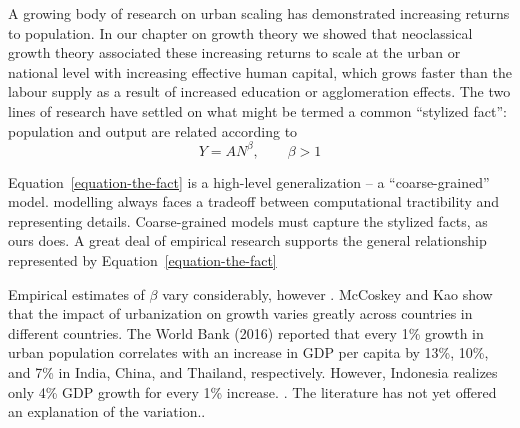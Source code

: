 A growing body of research on urban scaling has demonstrated increasing returns to population. In our chapter on growth theory we showed that neoclassical growth theory associated these increasing returns to scale at the urban or national level with increasing effective human capital, which grows faster than the labour supply as a result of increased education or agglomeration effects. The two lines of research have settled on what might be termed a  common ``stylized  fact'': population and output are related according to 
\begin{equation}
    Y=AN^\beta,\qquad \beta>1 \label{equation-the-fact}
\end{equation}

Equation~\ref{equation-the-fact}  is a high-level generalization -- a ``coarse-grained'' model.
modelling always faces a tradeoff between computational tractibility and representing details. Coarse-grained models must capture the stylized facts, as ours does. A great deal of empirical research supports the general relationship represented by Equation~\ref{equation-the-fact}

\cite{GET_TerrysDissertation, GET_PaulsBook}


Empirical estimates of $\beta$ vary considerably, however\cite{rosenthalEvidenceNatureSources2004}\cite{bettencourtIntroductionUrbanScience2021} \cite{loboUrbanScalingProduction2013}. 
McCoskey and Kao \cite{mccoskeyPanelDataInvestigation}show that  the impact of urbanization on growth varies greatly across countries in different countries.
The World Bank (2016) reported that every 1\% growth in urban population correlates with an increase in GDP per capita by 13\%, 10\%, and 7\% in India, China, and Thailand, respectively.  However, Indonesia realizes only 4\% GDP growth for every 1\% increase. \cite{haryantotriRelationshipUrbanizationEducation2021}. The literature has not yet offered an explanation  of the variation.\cite{loboUrbanScalingProduction2013}.

